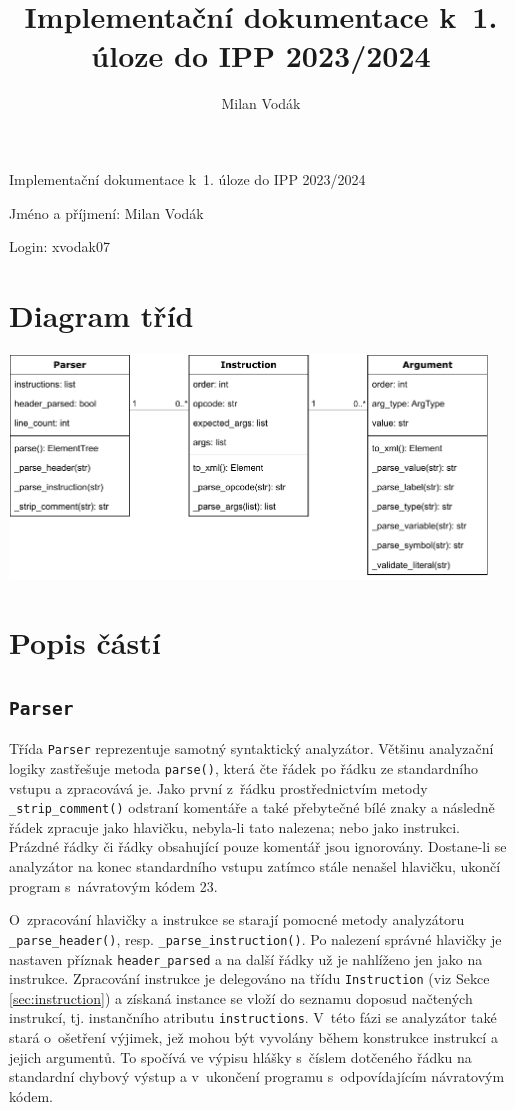 \documentclass{article}[a4paper]
\title{Implementační dokumentace k~1. úloze do IPP 2023/2024}
\author{Milan Vodák}
\begin{document}
    \begin{center}
        {\Large Implementační dokumentace k~1. úloze do IPP 2023/2024}

        Jméno a příjmení: Milan Vodák

        Login: xvodak07
    \end{center}

    \section{Diagram tříd}

    \begin{center}
        \includegraphics[width=0.95\textwidth]{class-diagram.pdf}
    \end{center}

    \section{Popis částí}

    \subsection{\texttt{Parser}}

    Třída \texttt{Parser} reprezentuje samotný syntaktický analyzátor.
    Většinu analyzační logiky zastřešuje metoda \texttt{parse()}, která čte řádek po řádku ze standardního vstupu a zpracovává je.
    Jako první z~řádku prostřednictvím metody \texttt{\_strip\_comment()} odstraní komentáře a také přebytečné bílé znaky a následně řádek zpracuje jako hlavičku, nebyla-li tato nalezena; nebo jako instrukci.
    Prázdné řádky či řádky obsahující pouze komentář jsou ignorovány.
    Dostane-li se analyzátor na konec standardního vstupu zatímco stále nenašel hlavičku, ukončí program s~návratovým kódem 23.

    O~zpracování hlavičky a instrukce se starají pomocné metody analyzátoru \texttt{\_parse\_header()}, resp. \texttt{\_parse\_instruction()}.
    Po nalezení správné hlavičky je nastaven příznak \texttt{header\_parsed} a na další řádky už je nahlíženo jen jako na instrukce.
    Zpracování instrukce je delegováno na třídu \texttt{Instruction} (viz Sekce \ref{sec:instruction}) a získaná instance se vloží
    do seznamu doposud načtených instrukcí, tj. instančního atributu \texttt{instructions}.
    V~této fázi se analyzátor také stará o~ošetření výjimek, jež mohou být vyvolány během konstrukce instrukcí a jejich argumentů.
    To spočívá ve výpisu hlášky s~číslem dotčeného řádku na standardní chybový výstup a v~ukončení programu s~odpovídajícím návratovým kódem.
\end{document}
